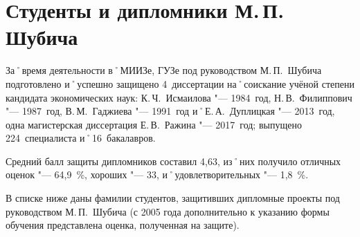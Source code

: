 ﻿\section{Студенты и дипломники М.\,П. Шубича}
За˚время деятельности в˚МИИЗе, ГУЗе под руководством М.\,П.~Шубича подготовлено и˚успешно защищено 4~диссертации на˚соискание учёной степени кандидата экономических наук: К.\,Ч.~Исмаилова "--- 1984~год, Н.\,В.~Филиппович "--- 1987~год, В.\,М.~Гаджиева "--- 1991~год и˚Е.\,А.~Дуплицкая "--- 2013~год, одна магистерская диссертация Е.\,В.~Ражина "--- 2017~год; выпущено 224~специалиста и˚16~бакалавров.

Средний балл защиты дипломников составил 4,63, из˚них получило отличных оценок "--- 64,9~\%, хороших "--- 33, и˚удовлетворительных "--- 1,8~\%.

В списке ниже даны фамилии студентов, защитивших дипломные проекты под руководством М.\,П.~Шубича (с 2005 года дополнительно к указанию формы обучения представлена  оценка, полученная на защите).

